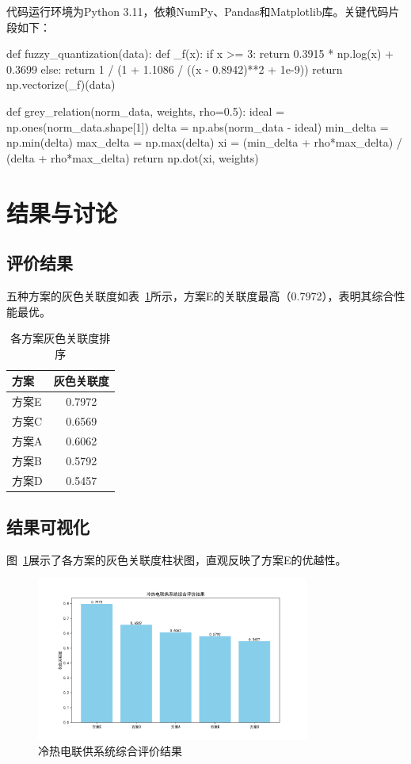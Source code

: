 \documentclass[12pt]{article}
\begin{document}
代码运行环境为Python 3.11，依赖NumPy、Pandas和Matplotlib库。关键代码片段如下：
\begin{python}[caption=关键算法实现]
def fuzzy_quantization(data):
    def _f(x):
        if x >= 3:
            return 0.3915 * np.log(x) + 0.3699
        else:
            return 1 / (1 + 1.1086 / ((x - 0.8942)**2 + 1e-9))
    return np.vectorize(_f)(data)

def grey_relation(norm_data, weights, rho=0.5):
    ideal = np.ones(norm_data.shape[1])
    delta = np.abs(norm_data - ideal)
    min_delta = np.min(delta)
    max_delta = np.max(delta)
    xi = (min_delta + rho*max_delta) / (delta + rho*max_delta)
    return np.dot(xi, weights)
\end{python}

\section{结果与讨论}

\subsection{评价结果}
五种方案的灰色关联度如表~\ref{tab:results}所示，方案E的关联度最高（0.7972），表明其综合性能最优。

\begin{table}[ht]
\centering
\caption{各方案灰色关联度排序}
\label{tab:results}
\begin{tabular}{lc}
\toprule
方案 & 灰色关联度 \\
\midrule
方案E & 0.7972 \\
方案C & 0.6569 \\
方案A & 0.6062 \\
方案B & 0.5792 \\
方案D & 0.5457 \\
\bottomrule
\end{tabular}
\end{table}

\subsection{结果可视化}
图~\ref{fig:bar}展示了各方案的灰色关联度柱状图，直观反映了方案E的优越性。

\begin{figure}[ht]
\centering
\includegraphics[width=0.8\textwidth]{../code/fig1/综合评价结果.png}
\caption{冷热电联供系统综合评价结果}
\label{fig:bar}
\end{figure}
\end{document}
